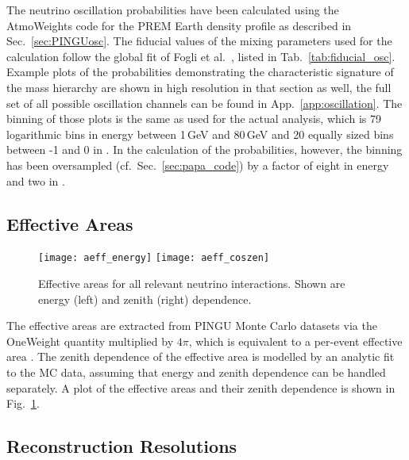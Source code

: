 The neutrino oscillation probabilities have been calculated using the
AtmoWeights code for the PREM Earth density profile as described in
Sec.~\ref{sec:PINGUosc}. The fiducial values of the mixing parameters used for
the calculation follow the global fit of Fogli et al.\ \cite{Fogli}, listed in
Tab.~\ref{tab:fiducial_osc}. Example plots of the probabilities demonstrating
the characteristic signature of the mass hierarchy are shown in high resolution
in that section as well, the full set of all possible oscillation channels can
be found in App.~\ref{app:oscillation}. The binning of those plots is the same
as used for the actual analysis, which is 79 logarithmic bins in energy between
1\,GeV and 80\,GeV and 20 equally sized bins between -1 and 0 in \coszen. In
the calculation of the probabilities, however, the binning has been oversampled
(cf.\ Sec.~\ref{sec:papa_code}) by a factor of eight in energy and two in
\coszen.

\subsection{Effective Areas}
\label{sec:input_aeff}

\begin{figure}[htbp]
 \centering
 \texttt{[image: aeff\_energy]}
 \texttt{[image: aeff\_coszen]}
 \caption{Effective areas for all relevant neutrino interactions. Shown are
  energy (left)  and zenith (right) dependence.}
\label{fig:aeffs}
\end{figure}

The effective areas are extracted from PINGU Monte Carlo datasets via the
OneWeight quantity multiplied by $4\pi$, which is equivalent to a per-event
effective area \cite{OneWeight}. The zenith dependence of the effective area is
modelled by an analytic fit to the MC data, assuming that energy and zenith
dependence can be handled separately. A plot of the effective areas and their
zenith dependence is shown in Fig.~\ref{fig:aeffs}.

\subsection{Reconstruction Resolutions}
\label{sec:input_reco}

